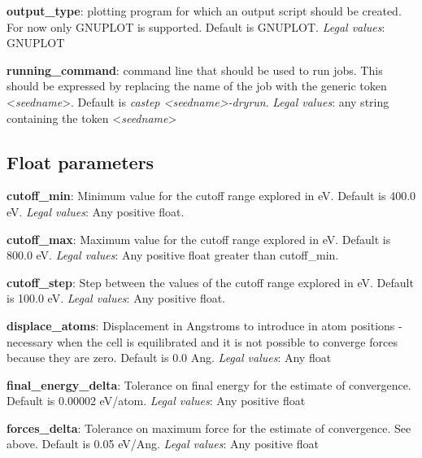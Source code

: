 \documentclass[10pt]{article}
\begin{document}
\textbf{output\_type}: plotting program for which an output script should be created. For now only GNUPLOT is supported. Default is GNUPLOT.\newline
\textit{Legal values}: GNUPLOT\newline

\textbf{running\_command}: command line that should be used to run jobs. This should be expressed by replacing the name of the job with the generic token \textless \textit{seedname}\textgreater. Default is \textit{castep \textless seedname\textgreater -dryrun}.\newline
\textit{Legal values}: any string containing the token \textless \textit{seedname}\textgreater\newline

\subsection{Float parameters}

\textbf{cutoff\_min}: Minimum value for the cutoff range explored in eV. Default is 400.0 eV.\newline
\textit{Legal values}: Any positive float.\newline

\textbf{cutoff\_max}: Maximum value for the cutoff range explored in eV. Default is 800.0 eV.\newline
\textit{Legal values}: Any positive float greater than cutoff\_min.\newline

\textbf{cutoff\_step}: Step between the values of the cutoff range explored in eV. Default is 100.0 eV.\newline
\textit{Legal values}: Any positive float.\newline

\textbf{displace\_atoms}: Displacement in Angstroms to introduce in atom positions - necessary when the cell is equilibrated and it is not possible to converge forces because they are zero. Default is 0.0 Ang.\newline
\textit{Legal values}: Any float\newline

\textbf{final\_energy\_delta}: Tolerance on final energy for the estimate of convergence. Default is 0.00002 eV/atom.\newline
\textit{Legal values}: Any positive float\newline

\textbf{forces\_delta}: Tolerance on maximum force for the estimate of convergence. See above. Default is 0.05 eV/Ang.\newline
\textit{Legal values}: Any positive float\newline
\end{document}
